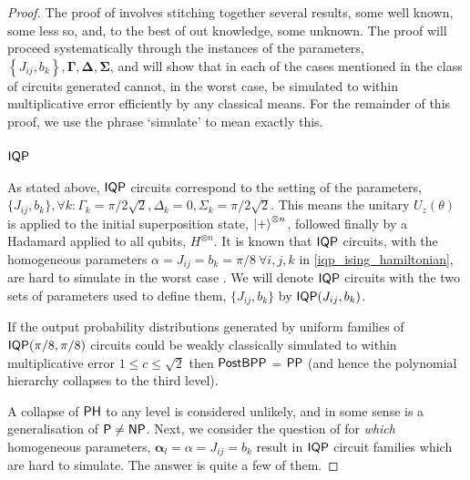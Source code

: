 \begin{proof}

The proof of  involves stitching together several results, some well known, some less so, and, to the best of out knowledge, some unknown. The proof will proceed systematically through the instances of the parameters, $\left\{ J_{ij}, b_{k}\right\}, \mathbf{\Gamma}, \mathbf{\Delta}, \mathbf{\Sigma}$, and will show that in each of the cases mentioned in  the class of circuits generated cannot, in the worst case, be simulated to within multiplicative error efficiently by any classical means. For the remainder of this proof, we use the phrase `simulate' to mean exactly this.

\subsubsection*{\texorpdfstring{$\operatorname{\textsf{IQP}}$}{IQP}}\label{appa:iqphardnessproof}
As stated above, $\operatorname{\textsf{IQP}}$ circuits correspond to the setting of the parameters, $\{J_{ij}, b_{k}\}, \forall k: \Gamma_k = \pi/2\sqrt{2} , \Delta_k = 0, \Sigma_k= \pi/2\sqrt{2} $. This means the unitary $U_z(\theta)$ is applied to the initial superposition state, $\ket{+}^{\otimes n}$, followed finally by a Hadamard applied to all qubits, $H^{\otimes n}$. It is known that $\operatorname{\textsf{IQP}}$ circuits, with the homogeneous parameters $\alpha = J_{ij} = b_{k} =  \pi/8\  \forall i,j,k$ in \eqref{iqp_ising_hamiltonian}, are hard to simulate in the worst case . We will denote $\operatorname{\textsf{IQP}}$ circuits with the two sets of parameters used to define them, $\{J_{ij}, b_k\}$ by $\operatorname{\textsf{IQP}}({J_{ij}}, {b_k})$.

\begin{theorem}\label{thm:iqphardnessbremner}
If the output probability distributions generated by uniform families of $\operatorname{\textsf{IQP}}(\pi/8, \pi/8)$ circuits could be weakly classically simulated to within multiplicative error $1 \leq c \leq \sqrt{2}$ then $\operatorname{\textsf{PostBPP}}$ = $\operatorname{\textsf{PP}}$ (and hence the polynomial hierarchy collapses to the third level).
\end{theorem}

A collapse of $\operatorname{\textsf{PH}}$ to any level is considered unlikely, and in some sense is a generalisation of $\operatorname{\textsf{P}} \neq \operatorname{\textsf{NP}}$.
Next, we consider the question of for \textit{which} homogeneous parameters, $\boldsymbol\alpha_l = \alpha = J_{ij} = b_{k}$ result in $\operatorname{\textsf{IQP}}$ circuit families which are hard to simulate. The answer is quite a few of them.


\end{proof}
